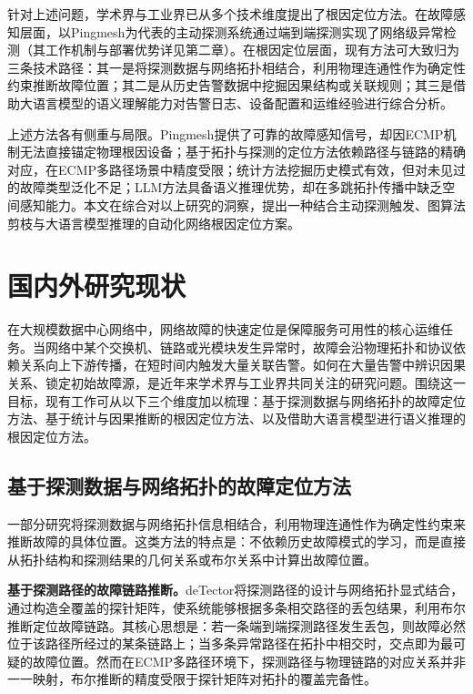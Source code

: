 针对上述问题，学术界与工业界已从多个技术维度提出了根因定位方法。在故障感知层面，以Pingmesh为代表的主动探测系统通过端到端探测实现了网络级异常检测（其工作机制与部署优势详见第二章）。在根因定位层面，现有方法可大致归为三条技术路径：其一是将探测数据与网络拓扑相结合，利用物理连通性作为确定性约束推断故障位置；其二是从历史告警数据中挖掘因果结构或关联规则；其三是借助大语言模型的语义理解能力对告警日志、设备配置和运维经验进行综合分析。

上述方法各有侧重与局限。Pingmesh提供了可靠的故障感知信号，却因ECMP机制无法直接锚定物理根因设备；基于拓扑与探测的定位方法依赖路径与链路的精确对应，在ECMP多路径场景中精度受限；统计方法挖掘历史模式有效，但对未见过的故障类型泛化不足；LLM方法具备语义推理优势，却在多跳拓扑传播中缺乏空间感知能力。本文在综合对以上研究的洞察，提出一种结合主动探测触发、图算法剪枝与大语言模型推理的自动化网络根因定位方案。

\section{国内外研究现状}

在大规模数据中心网络中，网络故障的快速定位是保障服务可用性的核心运维任务。当网络中某个交换机、链路或光模块发生异常时，故障会沿物理拓扑和协议依赖关系向上下游传播，在短时间内触发大量关联告警。如何在大量告警中辨识因果关系、锁定初始故障源，是近年来学术界与工业界共同关注的研究问题。围绕这一目标，现有工作可从以下三个维度加以梳理：基于探测数据与网络拓扑的故障定位方法、基于统计与因果推断的根因定位方法、以及借助大语言模型进行语义推理的根因定位方法。

\subsection{基于探测数据与网络拓扑的故障定位方法}

一部分研究将探测数据与网络拓扑信息相结合，利用物理连通性作为确定性约束来推断故障的具体位置。这类方法的特点是：不依赖历史故障模式的学习，而是直接从拓扑结构和探测结果的几何关系或布尔关系中计算出故障位置。

\textbf{基于探测路径的故障链路推断。}deTector将探测路径的设计与网络拓扑显式结合，通过构造全覆盖的探针矩阵，使系统能够根据多条相交路径的丢包结果，利用布尔推断定位故障链路。其核心思想是：若一条端到端探测路径发生丢包，则故障必然位于该路径所经过的某条链路上；当多条异常路径在拓扑中相交时，交点即为最可疑的故障位置。然而在ECMP多路径环境下，探测路径与物理链路的对应关系并非一一映射，布尔推断的精度受限于探针矩阵对拓扑的覆盖完备性。

